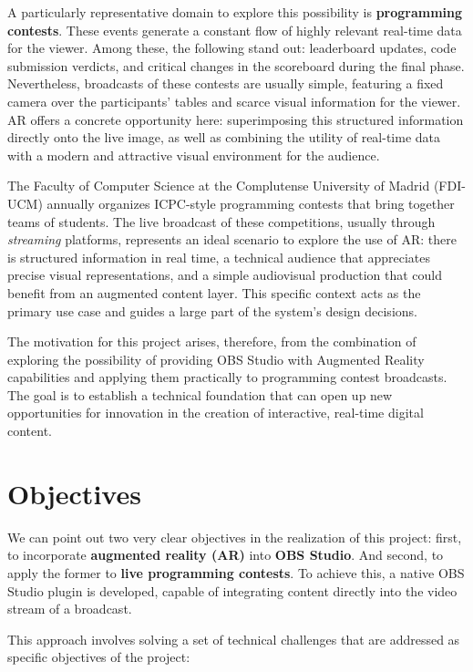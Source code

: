     A particularly representative domain to explore this possibility is \textbf{programming contests}. These events generate a constant flow of highly relevant real-time data for the viewer. Among these, the following stand out: leaderboard updates, code submission verdicts, and critical changes in the scoreboard during the final phase. Nevertheless, broadcasts of these contests are usually simple, featuring a fixed camera over the participants' tables and scarce visual information for the viewer. AR offers a concrete opportunity here: superimposing this structured information directly onto the live image, as well as combining the utility of real-time data with a modern and attractive visual environment for the audience.
    
    The Faculty of Computer Science at the Complutense University of Madrid (FDI-UCM) annually organizes ICPC-style programming contests that bring together teams of students. The live broadcast of these competitions, usually through \textit{streaming} platforms, represents an ideal scenario to explore the use of AR: there is structured information in real time, a technical audience that appreciates precise visual representations, and a simple audiovisual production that could benefit from an augmented content layer. This specific context acts as the primary use case and guides a large part of the system's design decisions.
    
    The motivation for this project arises, therefore, from the combination of exploring the possibility of providing OBS Studio with Augmented Reality capabilities and applying them practically to programming contest broadcasts. The goal is to establish a technical foundation that can open up new opportunities for innovation in the creation of interactive, real-time digital content.
    
    \section{Objectives}
    
    We can point out two very clear objectives in the realization of this project: first, to incorporate \textbf{augmented reality (AR)} into \textbf{OBS Studio}. And second, to apply the former to \textbf{live programming contests}. To achieve this, a native OBS Studio plugin is developed, capable of integrating content directly into the video stream of a broadcast.
    
    This approach involves solving a set of technical challenges that are addressed as specific objectives of the project:
    
